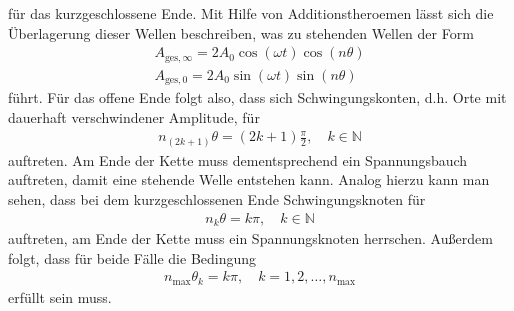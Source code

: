 für das kurzgeschlossene Ende.
Mit Hilfe von Additionstheroemen lässt sich die Überlagerung dieser Wellen beschreiben, was zu stehenden Wellen der Form
\begin{gather}
  A_{\text{ges}, \infty} = 2 A_0 \cos{(\omega t)} \cos{(n \theta)} \\
  A_{\text{ges}, 0} = 2 A_0 \sin{(\omega t)} \sin{(n \theta)}
\end{gather}
führt.
Für das offene Ende folgt also, dass sich Schwingungskonten, d.h. Orte mit dauerhaft verschwindener Amplitude, für
\begin{align*}
  n_{(2k+1)} \theta = (2k+1) \frac{\pi}{2}, \quad k \in \mathbb{N}
\end{align*}
auftreten.
Am Ende der Kette muss dementsprechend ein Spannungsbauch auftreten, damit eine stehende Welle entstehen kann.
Analog hierzu kann man sehen, dass bei dem kurzgeschlossenen Ende Schwingungsknoten für
\begin{align*}
  n_{k} \theta = k \pi, \quad k \in \mathbb{N}
\end{align*}
auftreten, am Ende der Kette muss ein Spannungsknoten herrschen.
Außerdem folgt, dass für beide Fälle die Bedingung
\begin{align*}
  n_{\text{max}} \theta_k = k \pi, \quad k = 1, 2, \ldots, n_{\text{max}}
\end{align*}
erfüllt sein muss.
